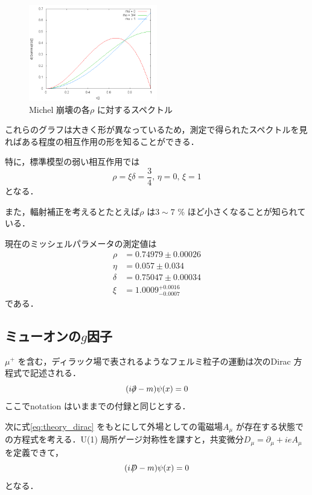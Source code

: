 	\begin{figure}[htbp]
	\centering
	\includegraphics[width = 0.5\textwidth]{figure/abe/michelgraph.png}
	\caption{Michel 崩壊の各$\rho$ に対するスペクトル}
	\label{zu:michelpar}
	\end{figure}
	これらのグラフは大きく形が異なっているため，測定で得られたスペクトルを見ればある程度の相互作用の形を知ることができる．

	特に，標準模型の弱い相互作用では
	\[ \rho = \xi\delta = \frac{3}{4},\, \eta = 0,\, \xi = 1 \]
	となる．

	また，輻射補正を考えるとたとえば$\rho$ は$3 \sim 7$ \% ほど小さくなることが知られている．

	現在のミッシェルパラメータの測定値は
	\begin{align*}
	\rho &= 0.74979 \pm 0.00026\\
	\eta &= 0.057 \pm 0.034\\
	\delta &= 0.75047 \pm 0.00034\\
	\xi &= 1.0009^{+0.0016}_{-0.0007}
	\end{align*}
	である．%
	
	\subsection{ミューオンの$g$因子}
	$\mu^{+}$ を含む，ディラック場で表されるようなフェルミ粒子の運動は次のDirac 方程式で記述される．
	\begin{equation}
	(i\Slash{\partial} - m)\psi(x) = 0
	\label{eq:theory_dirac}
	\end{equation}
ここでnotation はいままでの付録と同じとする．

	次に式\eqref{eq:theory_dirac} をもとにして外場としての電磁場$A_{\mu}$ が存在する状態での方程式を考える．U(1) 局所ゲージ対称性を課すと，共変微分$D_{\mu} = \partial_{\mu} + ieA_{\mu}$ を定義できて，
	\begin{equation}
	(i\Slash{D} - m)\psi(x) = 0
	\label{eq:theory_diracwitha}
	\end{equation}
となる．

